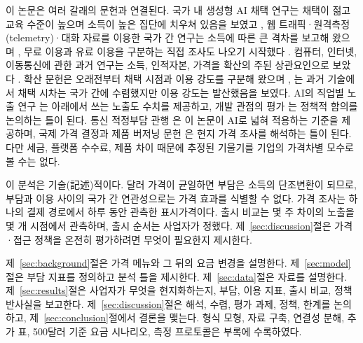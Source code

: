 \documentclass[11pt]{article}
\theoremstyle{definition}
\theoremstyle{remark}
\begin{document}
이 논문은 여러 갈래의 문헌과 연결된다. 국가 내 생성형 AI 채택 연구는 채택이 젊고 교육 수준이 높으며 소득이 높은 집단에 치우쳐 있음을 보였고 \citep{bick2024rapid,humlum2025unequal}, 웹 트래픽·원격측정(telemetry)·대화 자료를 이용한 국가 간 연구는 소득에 따른 큰 격차를 보고해 왔으며 \citep{liu2024who,liu2025who,misra2025measuring,chatterji2025how,appel2025uneven,daepp2026how,iscenko2026atlas}, 무료 이용과 유료 이용을 구분하는 직접 조사도 나오기 시작했다 \citep{kanzamanova2026digital}. 컴퓨터, 인터넷, 이동통신에 관한 과거 연구는 소득, 인적자본, 가격을 확산의 주된 상관요인으로 보았다 \citep{caselli2001cross,chinn2007determinants,aker2010mobile,bjorkegren2019adoption}. 확산 문헌은 오래전부터 채택 시점과 이용 강도를 구분해 왔으며 \citep{comin2004cross,comin2010exploration}, \citet{comin2018technology}는 과거 기술에서 채택 시차는 국가 간에 수렴했지만 이용 강도는 발산했음을 보였다. AI의 직업별 노출 연구 \citep{felten2021occupational,eloundou2024gpts,cazzaniga2024genai,gmyrek2025generative}는 아래에서 쓰는 노출도 수치를 제공하고, 개발 관점의 평가 \citep{korinek2021artificial,undp2025hdr,unctad2025tir,worldbank2026wdr}는 정책적 함의를 논의하는 틀이 된다. 통신 적정부담 관행 \citep{itu2025ff}은 이 논문이 AI로 넓혀 적용하는 기준을 제공하며, 국제 가격 결정과 제품 버저닝 문헌 \citep{goldberg1997goods,cavallo2014currency,mussa1978monopoly,goldfarb2019digital}은 현지 가격 조사를 해석하는 틀이 된다. 다만 세금, 플랫폼 수수료, 제품 차이 때문에 추정된 기울기를 기업의 가격차별 모수로 볼 수는 없다.

이 분석은 기술(記述)적이다. 달러 가격이 균일하면 부담은 소득의 단조변환이 되므로, 부담과 이용 사이의 국가 간 연관성으로는 가격 효과를 식별할 수 없다. 가격 조사는 하나의 결제 경로에서 하루 동안 관측한 표시가격이다. 출시 비교는 몇 주 차이의 노출을 몇 개 시점에서 관측하며, 출시 순서는 사업자가 정했다. 제~\ref{sec:discussion}절은 가격·접근 정책을 온전히 평가하려면 무엇이 필요한지 제시한다.

제~\ref{sec:background}절은 가격 메뉴와 그 뒤의 요금 변경을 설명한다. 제~\ref{sec:model}절은 부담 지표를 정의하고 분석 틀을 제시한다. 제~\ref{sec:data}절은 자료를 설명한다. 제~\ref{sec:results}절은 사업자가 무엇을 현지화하는지, 부담, 이용 지표, 출시 비교, 정책 반사실을 보고한다. 제~\ref{sec:discussion}절은 해석, 수렴, 평가 과제, 정책, 한계를 논의하고, 제~\ref{sec:conclusion}절에서 결론을 맺는다. 형식 모형, 자료 구축, 연결성 분해, 추가 표, 500달러 기준 요금 시나리오, 측정 프로토콜은 부록에 수록하였다.

\end{document}
